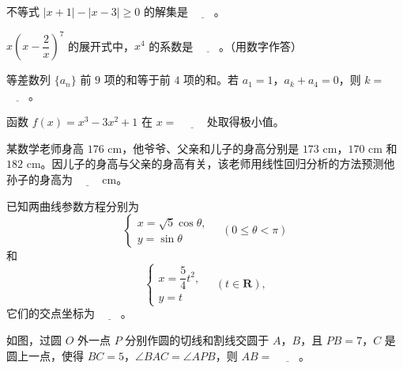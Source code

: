 \begin{question}
不等式 $|x+1|-|x-3|\geqslant0$ 的解集是 $\underline{\qquad}$。

\end{question}
\begin{question}
$x\left(x-\dfrac2x\right)^7$ 的展开式中，$x^4$ 的系数是 $\underline{\qquad}$。（用数字作答）

\end{question}
\begin{question}
等差数列 $\{a_n\}$ 前 $9$ 项的和等于前 $4$ 项的和。若 $a_1=1$，$a_k+a_4=0$，则 $k=$ $\underline{\qquad}$。

\end{question}
\begin{question}
函数 $f(x)=x^3-3x^2+1$ 在 $x=$ $\underline{\qquad}$ 处取得极小值。

\end{question}
\begin{question}
某数学老师身高 $176$ cm，他爷爷、父亲和儿子的身高分别是 $173$ cm，$170$ cm 和 $182$ cm。因儿子的身高与父亲的身高有关，该老师用线性回归分析的方法预测他孙子的身高为 $\underline{\qquad}$ cm。

\end{question}
\begin{question}
已知两曲线参数方程分别为
\nopagebreak[4]
\[\begin{cases}
x=\sqrt5\cos\theta,\\
y=\sin\theta
\end{cases}\quad(0\leqslant\theta<\pi)\]
和
\nopagebreak[4]
\[\begin{cases}
x=\dfrac54t^2,\\
y=t
\end{cases}\quad(t\in\mathbf R),\]
它们的交点坐标为 $\underline{\qquad}$。

\Needspace{0.4\textheight}
\end{question}
\begin{question}
如图，过圆 $O$ 外一点 $P$ 分别作圆的切线和割线交圆于 $A$，$B$，且 $PB=7$，$C$ 是圆上一点，使得 $BC=5$，$\angle BAC=\angle APB$，则 $AB=$ $\underline{\qquad}$。
\nopagebreak[4]
\begin{center}\end{center}
\nopagebreak[4]
\end{question}

